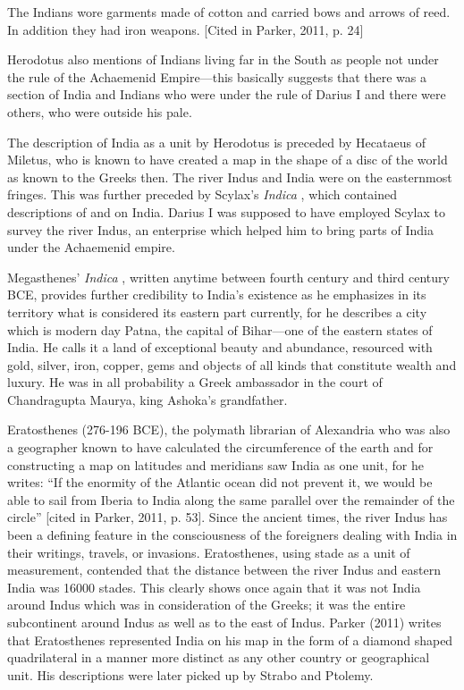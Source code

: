 The Indians wore garments made of cotton and carried bows and arrows of reed. In addition they had iron weapons. [Cited in Parker, 2011, p. 24]

Herodotus also mentions of Indians living far in the South as people not under the rule of the Achaemenid Empire—this basically suggests that there was a section of India and Indians who were under the rule of Darius I and there were others, who were outside his pale.

The description of India as a unit by Herodotus is preceded by Hecataeus of Miletus, who is known to have created a map in the shape of a disc of the world as known to the Greeks then. The river Indus and India were on the easternmost fringes. This was further preceded by Scylax’s \textit{Indica} , which contained descriptions of and on India. Darius I was supposed to have employed Scylax to survey the river Indus, an enterprise which helped him to bring parts of India under the Achaemenid empire.

Megasthenes’ \textit{Indica} , written anytime between fourth century and third century BCE, provides further credibility to India’s existence as he emphasizes in its territory what is considered its eastern part currently, for he describes a city which is modern day Patna, the capital of Bihar—one of the eastern states of India. He calls it a land of exceptional beauty and abundance, resourced with gold, silver, iron, copper, gems and objects of all kinds that constitute wealth and luxury. He was in all probability a Greek ambassador in the court of Chandragupta Maurya, king Ashoka’s grandfather. 

Eratosthenes (276-196 BCE), the polymath librarian of Alexandria who was also a geographer known to have calculated the circumference of the earth and for constructing a map on latitudes and meridians saw India as one unit, for he writes: “If the enormity of the Atlantic ocean did not prevent it, we would be able to sail from Iberia to India along the same parallel over the remainder of the circle” [cited in Parker, 2011, p. 53]. Since the ancient times, the river Indus has been a defining feature in the consciousness of the foreigners dealing with India in their writings, travels, or invasions. Eratosthenes, using stade as a unit of measurement, contended that the distance between the river Indus and eastern India was 16000 stades. This clearly shows once again that it was not India around Indus which was in consideration of the Greeks; it was the entire subcontinent around Indus as well as to the east of Indus. Parker (2011) writes that Eratosthenes represented India on his map in the form of a diamond shaped quadrilateral in a manner more distinct as any other country or geographical unit. His descriptions were later picked up by Strabo and Ptolemy. 

